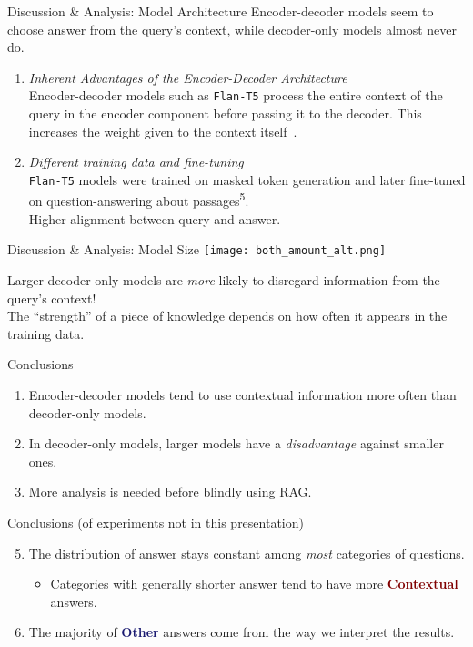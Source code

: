 \documentclass[10pt]{beamer}
\newcommand{\Contextual}{\textbf{\textcolor{Maroon}{Contextual}}}
\newcommand{\Other}{\textbf{\textcolor{MidnightBlue}{Other}}}
\begin{document}
\begin{frame}{Discussion \& Analysis: Model Architecture}
	Encoder-decoder models seem to choose answer from the query's context, while decoder-only models almost never do.

	\vfill{}

	\begin{enumerate}
		\item \emph{Inherent Advantages of the Encoder-Decoder Architecture} \\
			Encoder-decoder models such as \texttt{Flan-T5} process the entire context of the query in the encoder component before passing it to the decoder.
			This increases the weight given to the context itself~.
		\item \emph{Different training data and fine-tuning} \\
			\texttt{Flan-T5} models were trained on masked token generation and later fine-tuned on question-answering about passages\textsuperscript{5}. \\
			Higher alignment between query and answer.
	\end{enumerate}
\end{frame}

\begin{frame}{Discussion \& Analysis: Model Size}
	\texttt{[image: both\_amount\_alt.png]}

	\vfill{}

	Larger decoder-only models are \emph{more} likely to disregard information from the query's context! \\
	The ``strength'' of a piece of knowledge depends on how often it appears in the training data.
\end{frame}

\begin{frame}{Conclusions}
	\begin{enumerate}
		\item Encoder-decoder models tend to use contextual information more often than decoder-only models.
		\item In decoder-only models, larger models have a \emph{disadvantage} against smaller ones.
		\item More analysis is needed before blindly using RAG.
	\end{enumerate}
\end{frame}

\begin{frame}{Conclusions (of experiments not in this presentation)}
	\begin{enumerate}
		\setcounter{enumi}{4}
	\item The distribution of answer stays constant among \emph{most} categories of questions.
		\begin{itemize}
			\item Categories with generally shorter answer tend to have more \Contextual{} answers.
		\end{itemize}
	\item The majority of \Other{} answers come from the way we interpret the results.
	\end{enumerate}
\end{frame}
\end{document}
